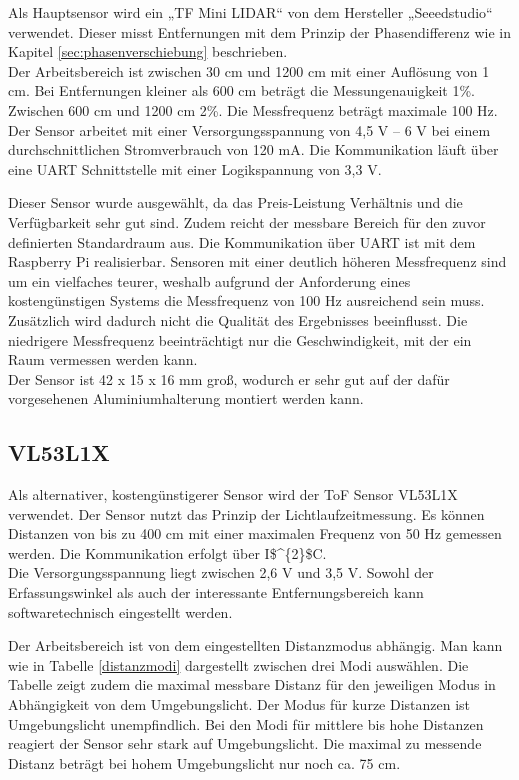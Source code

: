Als Hauptsensor wird ein „TF Mini \ac{LIDAR}“ von dem Hersteller „Seeedstudio“ verwendet. Dieser misst Entfernungen mit dem Prinzip der Phasendifferenz wie in Kapitel \ref{sec:phasenverschiebung} beschrieben.\\
Der Arbeitsbereich ist zwischen 30 cm und 1200 cm mit einer Auflösung von 1 cm. Bei Entfernungen kleiner als 600 cm beträgt die Messungenauigkeit 1\%. Zwischen 600 cm und 1200 cm 2\%. Die Messfrequenz beträgt maximale 100 Hz.\\
Der Sensor arbeitet mit einer Versorgungsspannung von 4,5 V – 6 V bei einem durchschnittlichen Stromverbrauch von 120 mA. Die Kommunikation läuft über eine \ac{UART} Schnittstelle mit einer Logikspannung von 3,3 V. \cite{TFMINI}

Dieser Sensor wurde ausgewählt, da das Preis-Leistung Verhältnis und die Verfügbarkeit sehr gut sind. Zudem reicht der messbare Bereich für den zuvor definierten Standardraum aus. Die Kommunikation über \ac{UART} ist mit dem Raspberry Pi realisierbar. Sensoren mit einer deutlich höheren Messfrequenz sind um ein vielfaches teurer, weshalb aufgrund der Anforderung eines kostengünstigen Systems die Messfrequenz von 100 Hz  ausreichend sein muss. Zusätzlich wird dadurch nicht die Qualität des Ergebnisses beeinflusst. Die niedrigere Messfrequenz beeinträchtigt nur die Geschwindigkeit, mit der ein Raum vermessen werden kann. \\
Der Sensor ist 42 x 15 x 16 mm groß, wodurch er sehr gut auf der dafür vorgesehenen Aluminiumhalterung montiert werden kann. 


\subsection{VL53L1X} \label{sec:VL53L1X}

Als alternativer, kostengünstigerer Sensor wird der \ac{ToF} Sensor VL53L1X verwendet. Der Sensor nutzt das Prinzip der Lichtlaufzeitmessung. Es können Distanzen von bis zu 400 cm mit einer maximalen Frequenz von 50 Hz gemessen werden. Die Kommunikation erfolgt über \ac{I$^{2}$C}. \\
Die Versorgungsspannung liegt zwischen 2,6 V und 3,5 V. Sowohl der Erfassungswinkel als auch der interessante Entfernungsbereich kann softwaretechnisch eingestellt werden. \cite{VL53L1X}

Der Arbeitsbereich ist von dem eingestellten Distanzmodus abhängig. Man kann wie in Tabelle \ref{distanzmodi} dargestellt zwischen drei Modi auswählen. Die Tabelle zeigt zudem die maximal messbare Distanz für den jeweiligen Modus in Abhängigkeit von dem Umgebungslicht. Der Modus für kurze Distanzen ist  Umgebungslicht unempfindlich. Bei den Modi für mittlere bis hohe Distanzen reagiert der Sensor sehr stark auf Umgebungslicht. Die maximal zu messende Distanz beträgt bei hohem Umgebungslicht nur noch ca. 75 cm. 

